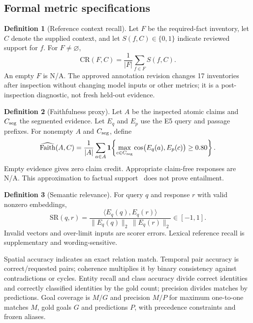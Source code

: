 \documentclass{amsart}
\theoremstyle{definition}
\newtheorem{defn}{Definition}[section]
\numberwithin{equation}{section}
\newcommand{\NAAA}{\textnormal{N/A}}
\begin{document}
\subsection{Formal metric specifications}
\begin{defn}[Reference context recall]\label{def:recall}
Let $F$ be the required-fact inventory, let $C$ denote the supplied context,
and let $S(f,C)\in\{0,1\}$ indicate reviewed support for $f$. For $F\ne\varnothing$,
\begin{equation}\label{eq:recall}
  \mathrm{CR}(F,C)=\frac{1}{|F|}\sum_{f\in F}S(f,C).
\end{equation}
An empty $F$ is \NAAA. The approved annotation revision changes 17 inventories
after inspection without changing model inputs or other metrics; it is a
post-inspection diagnostic, not fresh held-out evidence.
\end{defn}
\begin{defn}[Faithfulness proxy]\label{def:faithfulness}
Let $A$ be the inspected atomic claims and $C_{\rm seg}$ the segmented evidence.
Let $E_q$ and $E_p$ use the E5 query and passage prefixes. For nonempty $A$ and
$C_{\rm seg}$, define
\begin{equation}\label{eq:faithfulness}
 \widehat{\mathrm{Faith}}(A,C)=\frac{1}{|A|}\sum_{a\in A}
 \mathbf{1}\!\left\{\max_{c\in C_{\rm seg}}
 \cos\bigl(E_q(a),E_p(c)\bigr)\geq0.80\right\}.
\end{equation}
Empty evidence gives zero claim credit. Appropriate claim-free responses are
\NAAA. This approximation to factual support~\cite{ragas} does not prove entailment.
\end{defn}
\begin{defn}[Semantic relevance]\label{def:relevance}
For query $q$ and response $r$ with valid nonzero embeddings,
\begin{equation}\label{eq:relevance}
 \mathrm{SR}(q,r)=
 \frac{\langle E_q(q),E_q(r)\rangle}
 {\|E_q(q)\|_2\,\|E_q(r)\|_2}\in[-1,1].
\end{equation}
Invalid vectors and over-limit inputs are scorer errors. Lexical reference
recall is supplementary and wording-sensitive.
\end{defn}
Spatial accuracy indicates an exact relation match. Temporal pair accuracy is
correct/requested pairs; coherence multiplies it by binary consistency against
contradictions or cycles. Entity recall and class accuracy divide correct
identities and correctly classified identities by the gold count; precision
divides matches by predictions. Goal coverage is $M/G$ and precision $M/P$ for
maximum one-to-one matches $M$, gold goals $G$ and predictions $P$, with
precedence constraints and frozen aliases.
\end{document}
